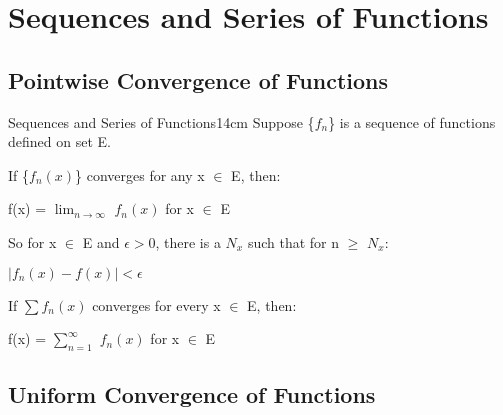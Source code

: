 \newpage

\section[Day 5: Sequences \textbackslash \ Series of Functions]
{ Sequences and Series of Functions }

\subsection[ Convergence ]{ Pointwise Convergence of Functions }

    \begin{definition}{Sequences and Series of Functions}{14cm}
        Suppose \{$f_n$\} is a sequence of functions defined on set E.

        If \{$f_n(x)$\} converges for any x $\in$ E, then:

        \hspace{0.5cm}
        f(x) = $\lim_{n \rightarrow \infty}$ $f_n(x)$ for x $\in$ E

        So for x $\in$ E and $\epsilon > 0$, there is a $N_x$ such that
        for n $\geq$ $N_x$:

        \hspace{0.5cm}
        $|f_n(x) - f(x)| < \epsilon$

        \vspace{0.3cm}

        If $\sum f_n(x)$ converges for every x $\in$ E, then:

        \hspace{0.5cm}
        f(x) = $\sum_{n=1}^{\infty}$ $f_n(x)$ for x $\in$ E        
    \end{definition}

    \vspace{0.5cm}





\subsection[ Uniform Convergence ]{ Uniform Convergence of Functions }

